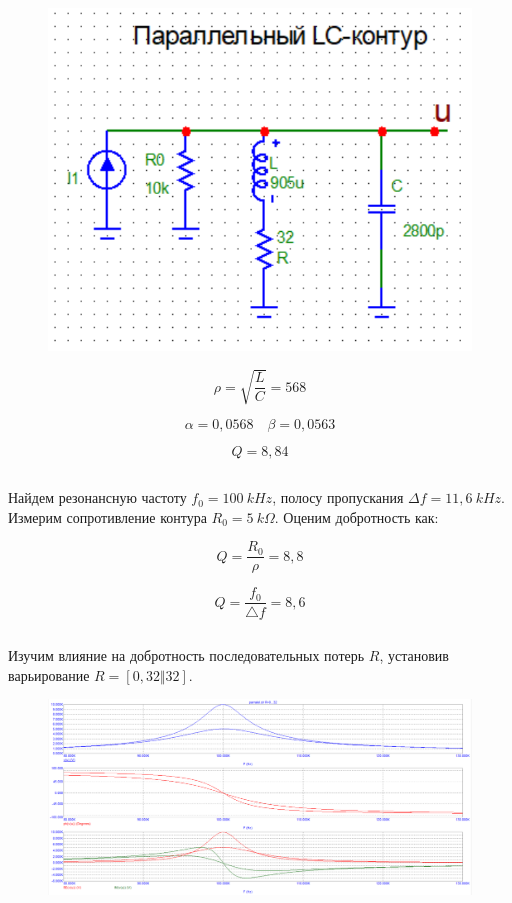 \documentclass{article}
\begin{document}
\begin{figure}[H]
\centering
\includegraphics[scale=0.4]{parallel_img.png}
\label{fig:Image1}
\end{figure} 

\[\rho = \sqrt{\frac{L}{C}} = 568\]

\[\alpha = 0,0568 \quad \beta = 0,0563\]

\[Q = 8,84\]

\subsection{}
Найдем резонансную частоту $f_0 = 100 \: kHz$, полосу пропускания $\Delta f = 11,6 \: kHz$. Измерим сопротивление контура $R_0 = 5 \: k\Omega$. Оценим добротность как:

\[Q = \frac{R_0}{\rho} = 8,8\]

\[Q = \frac{f_0}{\triangle f} = 8,6\]

\subsection{}
Изучим влияние на добротность последовательных потерь $R$, установив варьирование $R = [0, 32 \Vert 32]$. 

\begin{figure}[H]
\centering
\includegraphics[scale=0.4]{parallel_AC1.png}
\label{fig:Image1}
\end{figure} 
\end{document}
